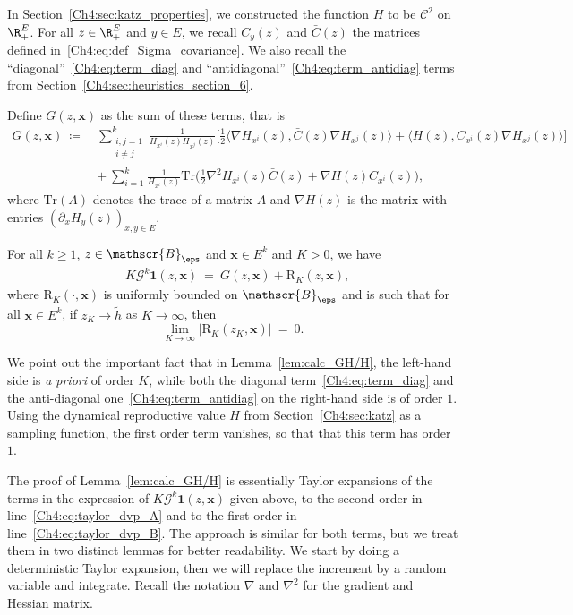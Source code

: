 \begin{refsegment}
In Section~\ref{Ch4:sec:katz_properties}, we constructed the function $H$ to be $\mathcal C^2$ on $\R_+^E$.
For all $z\in \R_+^E$ and $y\in E$, we recall  $C_y(z)$ and $\bar C(z)$ the matrices defined in~\eqref{Ch4:eq:def_Sigma_covariance}.
We also recall the ``diagonal''~\eqref{Ch4:eq:term_diag} and ``antidiagonal''~\eqref{Ch4:eq:term_antidiag} terms from Section~\ref{Ch4:sec:heuristics_section_6}.
\begin{lem}\label{lem:calc_GH/H}
Define $G(z,\bm x)$ as the sum of these terms, that is
\begin{align*}
G(z,\bm x)\ \coloneqq\ &
\sum_{\substack{i,j=1 \\ i\neq j}}^k\frac{1}{H_{x^i}(z)H_{x^j}(z)} \bigg[ \frac{1}{2}  \big\langle \nabla H_{x^i}(z) ,\bar C(z) \nabla H_{x^j}(z)\big\rangle 
+ \big\langle H(z), C_{x^i}(z) \nabla H_{x^j}(z)\big\rangle \bigg]
\\
&+\ \sum_{i=1}^k\frac{1}{H_{x^i}(z)}\mathrm{Tr}\Big(
  \frac{1}{2} \nabla^2 H_{x^i}(z) \bar C(z)
  +  \nabla H(z)  C_{x^i}(z)\Big),
\end{align*}
where $\mathrm{Tr}(A)$ denotes the trace of a matrix $A$ and $\nabla H(z)$ is the matrix with entries $(\partial_x H_y(z))_{x,y\in E}$.


For all $k\geq 1$, $z\in \mathscr{B}_{\eps}$ and $\bm x\in E^k$ and $K>0$, we have
\begin{align*}
&K\mathcal{G}^k\bm{1}(z,\bm x)\ =\
G(z,{\bm x})  +  \mathrm{R}_K(z,\bm x),
\end{align*}
where $\mathrm{R}_K(\cdot,\bm x)$ is uniformly bounded on $\mathscr{B}_\eps$ and is such that for all $\bm x\in E^k$, if  $z_K\to\tilde h$ as $K\to\infty$, then
\[
 \lim_{K\to \infty}\big|\mathrm{R}_K(z_K,\bm x)\big|\ =\ 0.
\]
\end{lem}

\begin{rem}
We point out the important fact that in Lemma~\ref{lem:calc_GH/H}, the left-hand side is \textit{a priori} of order $K$, while both the diagonal term~\eqref{Ch4:eq:term_diag} and the anti-diagonal one~\eqref{Ch4:eq:term_antidiag} on the right-hand side is of order $1$. Using the dynamical reproductive value $H$ from Section~\ref{Ch4:sec:katz} as a sampling function, the first order term vanishes, so that that this term has order $1$. 
\end{rem}

The proof of Lemma~\ref{lem:calc_GH/H} is essentially Taylor expansions of the terms in the expression of $K\mathcal{G}^k\bm 1(z,\bm x)$ given above, to the second order in line~\eqref{Ch4:eq:taylor_dvp_A} and to the first order in line~\eqref{Ch4:eq:taylor_dvp_B}. The approach is similar for both terms, but we treat them in two distinct lemmas for better readability. We start by doing a deterministic Taylor expansion, then we will replace the increment by a random variable and integrate.
Recall the notation  $\nabla$ and $\nabla^2$ for the gradient and Hessian matrix.



\end{refsegment}
